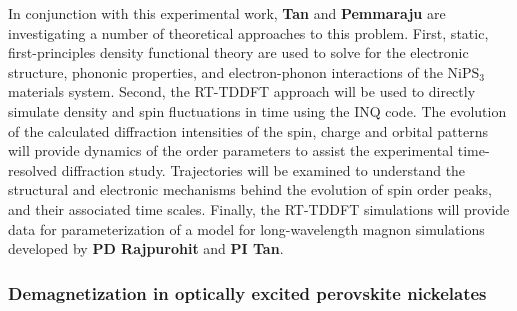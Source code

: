 In conjunction with this experimental work, {\bf Tan} and {\bf Pemmaraju} are investigating a number of theoretical approaches to this problem.
First, static, first-principles density functional theory are used to solve for the electronic structure, phononic properties, and electron-phonon interactions of the \(\mathrm{NiPS_3}\) materials system. 
Second, the RT-TDDFT approach will be used to directly simulate density and spin fluctuations in time using the \textsc{INQ} code.
The evolution of the calculated diffraction intensities of the spin, charge and orbital patterns will provide dynamics of the order parameters to assist the experimental time-resolved diffraction study.
Trajectories will be examined to understand the structural and electronic mechanisms behind the evolution of spin order peaks, and their associated time scales. 
Finally, the RT-TDDFT simulations will provide data for parameterization of a model for long-wavelength magnon simulations developed by \textbf{PD Rajpurohit} and \textbf{PI Tan}. 

\subsubsection{Demagnetization in optically excited perovskite nickelates}

